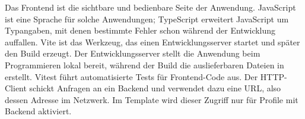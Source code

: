 \begin{beginnerstatement}

Das Frontend ist die sichtbare und bedienbare Seite der Anwendung. JavaScript
ist eine Sprache für solche Anwendungen; TypeScript erweitert JavaScript um
Typangaben, mit denen bestimmte Fehler schon während der Entwicklung auffallen.
Vite ist das Werkzeug, das einen Entwicklungsserver startet und später den
Build erzeugt. Der Entwicklungsserver stellt die Anwendung beim Programmieren
lokal bereit, während der Build die auslieferbaren Dateien in
 erstellt. Vitest führt automatisierte Tests für
Frontend-Code aus. Der HTTP-Client schickt Anfragen an ein Backend und verwendet
dazu eine URL, also dessen Adresse im Netzwerk. Im Template wird dieser Zugriff
nur für Profile mit Backend aktiviert.

\end{beginnerstatement}
